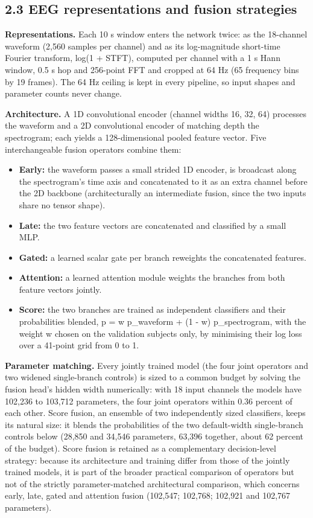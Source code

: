\documentclass[11pt,a4paper]{article}
\providecommand{\tightlist}{%
  \setlength{\itemsep}{0pt}\setlength{\parskip}{0pt}}
\begin{document}
\subsection{2.3 EEG representations and fusion strategies}\label{eeg-representations-and-fusion-strategies}

\textbf{Representations.} Each 10 s window enters the network twice: as the 18-channel
waveform (2,560 samples per channel) and as its log-magnitude short-time Fourier
transform, log(1 + \textbar STFT\textbar), computed per channel with a 1 s Hann window, 0.5 s hop and
256-point FFT and cropped at 64 Hz (65 frequency bins by 19 frames).
The 64 Hz ceiling is kept in every pipeline, so input shapes and
parameter counts never change.

\textbf{Architecture.} A 1D convolutional encoder (channel widths 16, 32, 64) processes the
waveform and a 2D convolutional encoder of matching depth the spectrogram; each yields
a 128-dimensional pooled feature vector. Five interchangeable fusion operators combine
them:

\begin{itemize}
\tightlist
\item
  \textbf{Early:} the waveform passes a small strided 1D encoder, is broadcast along the
  spectrogram's time axis and concatenated to it as an extra channel before the 2D
  backbone (architecturally an intermediate fusion, since the two inputs share no
  tensor shape).
\item
  \textbf{Late:} the two feature vectors are concatenated and classified by a small MLP.
\item
  \textbf{Gated:} a learned scalar gate per branch reweights the concatenated features.
\item
  \textbf{Attention:} a learned attention module weights the branches from both feature
  vectors jointly.
\item
  \textbf{Score:} the two branches are trained as independent classifiers and their
  probabilities blended, p = w p\_waveform + (1 - w) p\_spectrogram, with the weight w
  chosen on the validation subjects only, by minimising their log loss over a 41-point
  grid from 0 to 1.
\end{itemize}

\textbf{Parameter matching.} Every jointly trained model (the four joint operators and two
widened single-branch controls) is sized to a common budget by solving the fusion
head's hidden width numerically: with 18 input channels the models
have 102,236 to 103,712 parameters, the four joint operators within 0.36 percent of
each other. Score fusion, an ensemble of two independently sized classifiers, keeps
its natural size: it blends the probabilities of the two default-width single-branch
controls below (28,850 and 34,546 parameters, 63,396 together, about 62 percent of the
budget). Score fusion is retained as a complementary decision-level strategy: because
its architecture and training differ from those of the jointly trained models, it is
part of the broader practical comparison of operators but not of the strictly
parameter-matched architectural comparison, which concerns early, late, gated and
attention fusion (102,547; 102,768; 102,921 and 102,767 parameters).
\end{document}
